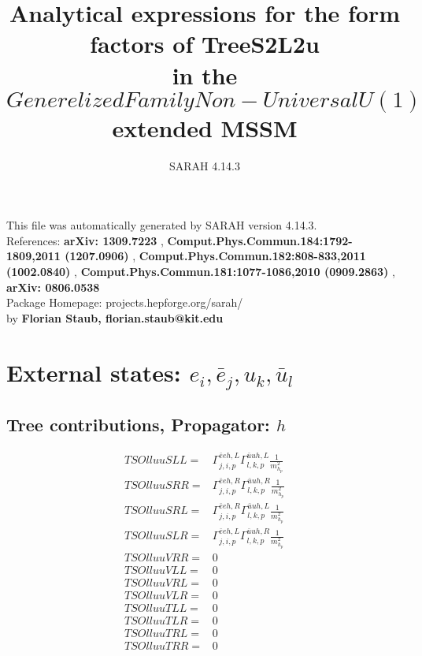 \documentclass[A4,landscape]{article}
\begin{document}
\title{Analytical expressions for the form factors of TreeS2L2u\\ in the $Generelized Family Non-Universal U(1)$ extended MSSM } 
 \author{SARAH 4.14.3} 
 \maketitle 
 \vspace{10cm} 
This file was automatically generated by SARAH version 4.14.3.  \\ 
References: {\bf arXiv: 1309.7223 }, {\bf Comput.Phys.Commun.184:1792-1809,2011 (1207.0906) }, {\bf Comput.Phys.Commun.182:808-833,2011 (1002.0840) }, {\bf Comput.Phys.Commun.181:1077-1086,2010 (0909.2863) }, {\bf arXiv: 0806.0538 } \\ 
Package Homepage: projects.hepforge.org/sarah/ \\ 
by {\bf Florian Staub, florian.staub@kit.edu} 
 \pagebreak 
 \tableofcontents 
 \pagebreak 
\section{External states: ${e_{{i}}, \bar{e}_{{j}}, u_{{k}}, \bar{u}_{{l}}}$} 
\subsection{Tree contributions, Propagator: $h$} 

\begin{align} 
  TSOlluuSLL= & \Gamma^{\bar{e}e h ,L}_{j, i, p} \Gamma^{\bar{u}u h ,L}_{l, k, p} \frac{1}{m^2_{h_{{p}}}} \\ 
  TSOlluuSRR= & \Gamma^{\bar{e}e h ,R}_{j, i, p} \Gamma^{\bar{u}u h ,R}_{l, k, p} \frac{1}{m^2_{h_{{p}}}} \\ 
  TSOlluuSRL= & \Gamma^{\bar{e}e h ,R}_{j, i, p} \Gamma^{\bar{u}u h ,L}_{l, k, p} \frac{1}{m^2_{h_{{p}}}} \\ 
  TSOlluuSLR= & \Gamma^{\bar{e}e h ,L}_{j, i, p} \Gamma^{\bar{u}u h ,R}_{l, k, p} \frac{1}{m^2_{h_{{p}}}} \\ 
  TSOlluuVRR= & 0 \\ 
  TSOlluuVLL= & 0 \\ 
  TSOlluuVRL= & 0 \\ 
  TSOlluuVLR= & 0 \\ 
  TSOlluuTLL= & 0 \\ 
  TSOlluuTLR= & 0 \\ 
  TSOlluuTRL= & 0 \\ 
  TSOlluuTRR= & 0 \\ 
\end{align} 
\end{document}
